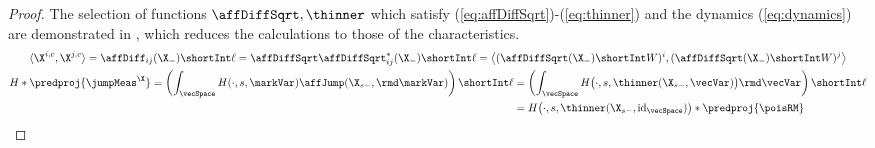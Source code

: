 \begin{proof}
  The selection of functions $\affDiffSqrt, \thinner$ which satisfy (\ref{eq:affDiffSqrt})-(\ref{eq:thinner}) and the dynamics (\ref{eq:dynamics}) are demonstrated in \cite[Theorem III.2.26 and Remark III.2.28]{jacod2003}, which reduces the calculations to those of the characteristics.
  \begin{gather}
    \langle \X^{i,c}, \X^{j,c} \rangle 
    = \affDiff_{ij}(\X_-) \shortInt \ell
    = \affDiffSqrt\affDiffSqrt^*_{ij}(\X_-) \shortInt \ell
    = \big\langle (\affDiffSqrt(\X_-) \shortInt W)^i, (\affDiffSqrt(\X_-) \shortInt W)^j \big\rangle \\
    \begin{aligned}[t]
      H \ast \predproj{\jumpMeas^\X} = \left( \int_\vecSpace H(\cdot, s, \markVar) \affJump(\X_{s-}, \rmd\markVar) \right) \shortInt \ell
      &= \left( \int_\vecSpace H\big(\cdot, s, \thinner(\X_{s-}, \vecVar)\big) \rmd\vecVar \right) \shortInt \ell \\
      &= H\big(\cdot, s, \thinner(\X_{s-},\operatorname{id}_\vecSpace)\big)  \ast \predproj{\poisRM}
    \end{aligned}
  \end{gather}
\end{proof}
